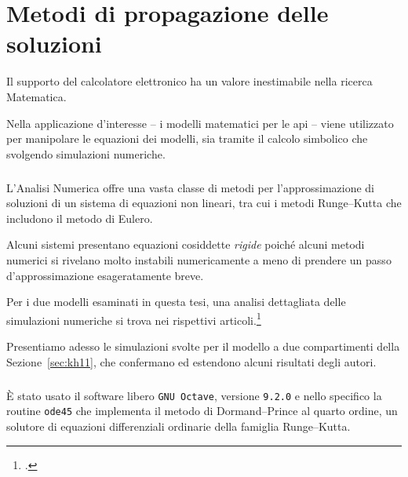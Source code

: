 \chapter{Metodi di propagazione delle soluzioni}
Il supporto del calcolatore elettronico ha un valore inestimabile nella ricerca Matematica.

Nella applicazione d'interesse -- i modelli matematici per le api -- viene utilizzato
per manipolare le equazioni dei modelli, sia tramite il calcolo simbolico che svolgendo simulazioni numeriche.

\paragraph{}
L'Analisi Numerica offre una vasta classe di metodi per l'approssimazione di soluzioni di un sistema di equazioni
non lineari, tra cui i metodi Runge--Kutta che includono il metodo di Eulero.

Alcuni sistemi presentano equazioni cosiddette \emph{rigide} poiché alcuni metodi numerici si rivelano
molto instabili numericamente a meno di prendere un passo d'approssimazione esageratamente breve.

Per i due modelli esaminati in questa tesi, una analisi dettagliata delle simulazioni numeriche
si trova nei rispettivi articoli.\footcite{khoury2011,ratti2017}

Presentiamo adesso le simulazioni svolte per il modello a due compartimenti della Sezione~\ref{sec:kh11},
che confermano ed estendono alcuni risultati degli autori.

\paragraph{}
È stato usato il software libero \texttt{GNU Octave}, versione \texttt{9.2.0} e nello specifico
la routine \texttt{ode45} che implementa il metodo di Dormand--Prince al quarto ordine, un solutore
di equazioni differenziali ordinarie della famiglia Runge--Kutta.

